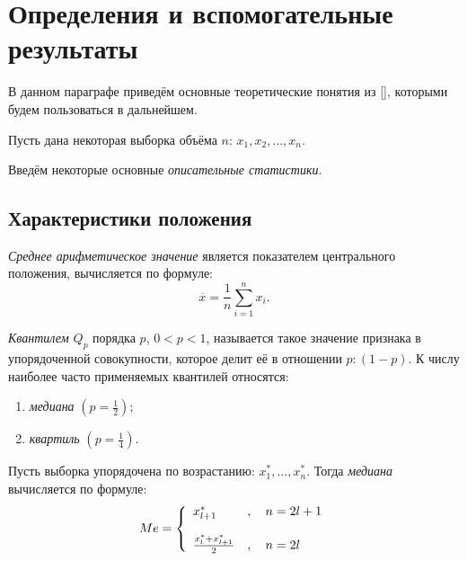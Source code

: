 \newpage
\chapter{Определения и вспомогательные результаты}

В данном параграфе приведём основные теоретические понятия из [], которыми 
будем пользоваться в дальнейшем.

Пусть дана некоторая выборка объёма $n$: $x_1, x_2, \ldots, x_n$.

Введём некоторые основные \textit{описательные статистики}.

\section*{Характеристики положения} %
\label{sec:chars_pos}

\textit{Среднее арифметическое значение} является показателем 
центрального положения, вычисляется по формуле:
\begin{equation*}
	\overline{x} = \frac{1}{n} \sum_{i=1}^n{x_i}.
\end{equation*}

\textit{Квантилем $Q_p$} порядка $p$, $0<p<1$, называется такое значение признака в упорядоченной совокупности, которое делит её в отношении $p: (1 - p)$. К числу наиболее часто применяемых квантилей относятся:
\begin{enumerate}
	\item \textit{медиана} $(p = \frac{1}{2})$;
	\item \textit{квартиль} $(p = \frac{1}{4})$.
\end{enumerate}

Пусть выборка упорядочена по возрастанию: $x_{1}^{*}, \ldots, x_{n}^{*}$. Тогда \textit{медиана} вычисляется по формуле:
\begin{equation*}
Me = \left\{
 \begin{array}{l l}
   x_{l+1}^{*} &, \quad n = 2l + 1 \\
   \\
   \frac{x_l^{*} + x_{l+1}^{*}}{2} &, \quad n = 2l
 \end{array} \right.
\end{equation*}


